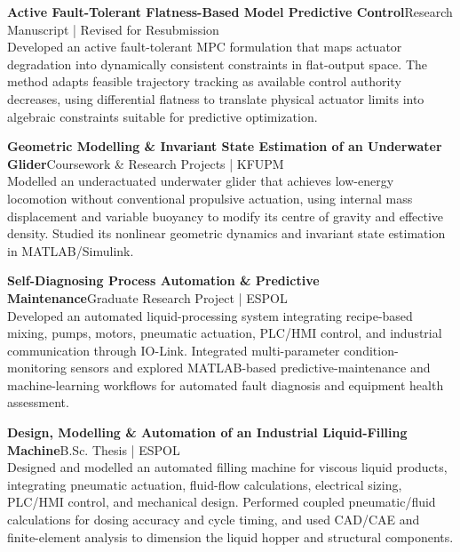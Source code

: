 \documentclass[10pt,a4paper]{article}
\newcommand{\entrytitle}[2]{%
  \textbf{#1}\hfill\textcolor{metacolor}{\small #2}%
}
\begin{document}
\vspace{4pt}
\entrytitle{Active Fault-Tolerant Flatness-Based Model Predictive Control}{Research Manuscript | Revised for Resubmission}\\
Developed an active fault-tolerant MPC formulation that maps actuator degradation into dynamically consistent constraints in flat-output space. The method adapts feasible trajectory tracking as available control authority decreases, using differential flatness to translate physical actuator limits into algebraic constraints suitable for predictive optimization.

\vspace{4pt}
\entrytitle{Geometric Modelling \& Invariant State Estimation of an Underwater Glider}{Coursework \& Research Projects | KFUPM}\\
Modelled an underactuated underwater glider that achieves low-energy locomotion without conventional propulsive actuation, using internal mass displacement and variable buoyancy to modify its centre of gravity and effective density. Studied its nonlinear geometric dynamics and invariant state estimation in MATLAB/Simulink.

\vspace{4pt}
\entrytitle{Self-Diagnosing Process Automation \& Predictive Maintenance}{Graduate Research Project | ESPOL}\\
Developed an automated liquid-processing system integrating recipe-based mixing, pumps, motors, pneumatic actuation, PLC/HMI control, and industrial communication through IO-Link. Integrated multi-parameter condition-monitoring sensors and explored MATLAB-based predictive-maintenance and machine-learning workflows for automated fault diagnosis and equipment health assessment.

\vspace{4pt}
\entrytitle{Design, Modelling \& Automation of an Industrial Liquid-Filling Machine}{B.Sc. Thesis | ESPOL}\\
Designed and modelled an automated filling machine for viscous liquid products, integrating pneumatic actuation, fluid-flow calculations, electrical sizing, PLC/HMI control, and mechanical design. Performed coupled pneumatic/fluid calculations for dosing accuracy and cycle timing, and used CAD/CAE and finite-element analysis to dimension the liquid hopper and structural components.

\clearpage

\end{document}
